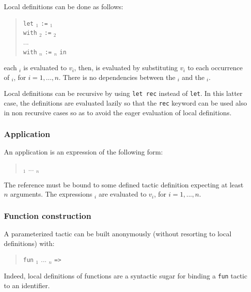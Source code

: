 Local definitions can be done as follows:
\begin{quote}
{\tt let} {\ident}$_1$ {\tt :=} {\tacexpr}$_1$\\
{\tt with} {\ident}$_2$ {\tt :=} {\tacexpr}$_2$\\
...\\
{\tt with} {\ident}$_n$ {\tt :=} {\tacexpr}$_n$ {\tt in}\\
{\tacexpr}
\end{quote}
each {\tacexpr}$_i$ is evaluated to $v_i$, then, {\tacexpr} is
evaluated by substituting $v_i$ to each occurrence of {\ident}$_i$,
for $i=1,...,n$. There is no dependencies between the {\tacexpr}$_i$
and the {\ident}$_i$.

Local definitions can be recursive by using {\tt let rec} instead of
{\tt let}. In this latter case, the definitions are evaluated lazily
so that the {\tt rec} keyword can be used also in non recursive cases
so as to avoid the eager evaluation of local definitions.

\subsubsection{Application}

An application is an expression of the following form:
\begin{quote}
{\qualid} {\tacarg}$_1$ ... {\tacarg}$_n$
\end{quote}
The reference {\qualid} must be bound to some defined tactic
definition expecting at least $n$ arguments.  The expressions
{\tacexpr}$_i$ are evaluated to $v_i$, for $i=1,...,n$.


\subsubsection[Function construction]{Function construction
}

A parameterized tactic can be built anonymously (without resorting to
local definitions) with:
\begin{quote}
{\tt fun} {\ident${}_1$} ... {\ident${}_n$} {\tt =>} {\tacexpr}
\end{quote}
Indeed, local definitions of functions are a syntactic sugar for
binding a {\tt fun} tactic to an identifier.

